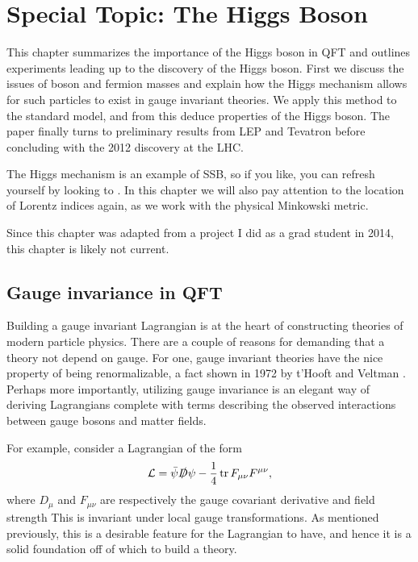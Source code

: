 \chapter{Special Topic: The Higgs Boson}\label{ap:spec_higgs}

This chapter summarizes the importance of the Higgs boson in QFT and outlines
experiments leading up to the discovery of the Higgs boson.
First we discuss the issues of boson and fermion masses and explain
how the Higgs mechanism allows for such particles to exist in gauge invariant
theories. We apply this method to the standard model, and from this deduce
properties of the Higgs boson. The paper finally turns to preliminary results 
from LEP and Tevatron before concluding with the 2012 discovery at the LHC.

The Higgs mechanism is an example of SSB, so if you like, you can refresh
yourself by looking to . In this chapter we will
also pay attention to the location of Lorentz indices again, as we
work with the physical Minkowski metric.

Since this chapter was adapted from a project I did as a grad student in 2014,
this chapter is likely not current.

\section{Gauge invariance in QFT}

Building a gauge invariant Lagrangian is at the heart of constructing theories
of modern particle physics. There are a couple of reasons for demanding that a
theory not depend on gauge. For one, gauge invariant theories have the nice
property of being renormalizable, a fact shown in 1972 by t'Hooft and Veltman 
\cite{t_hooft_regularization_1972}. Perhaps more importantly, utilizing gauge
invariance is an elegant way of deriving Lagrangians complete with terms
describing the observed interactions between gauge bosons and matter fields.

For example, consider a Lagrangian of the form
\begin{equation}
  \label{eq:genLagr}
  \mathcal{L}=\bar{\psi}\slashed{D}\psi-\frac{1}{4}\tr F_{\mu\nu}F^{\mu\nu} ,
\end{equation}
where $D_{\mu}$ and $F_{\mu\nu}$ are respectively the gauge covariant
derivative and field strength
This is invariant under local gauge transformations. 
As mentioned previously, this is a desirable feature for the
Lagrangian to have, and hence it is a solid foundation off of which to build
a theory.


